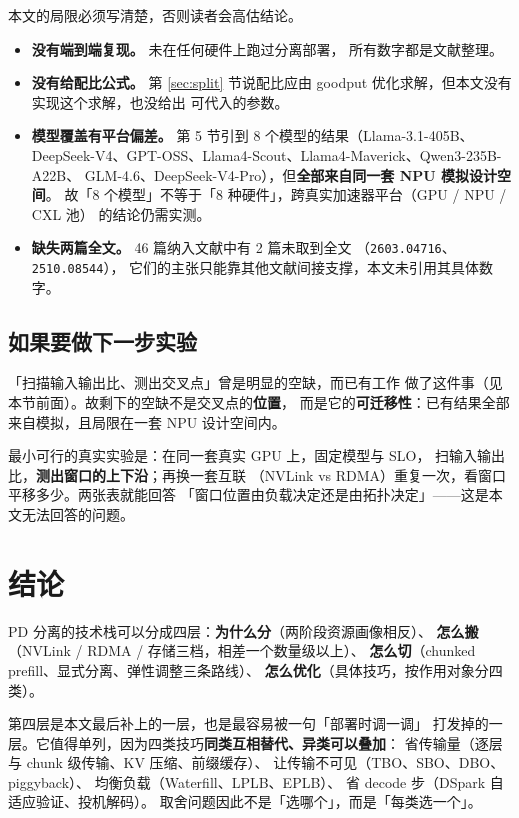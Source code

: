 本文的局限必须写清楚，否则读者会高估结论。

\begin{itemize}[leftmargin=1.3em,itemsep=1.5pt,topsep=2pt]
  \item \textbf{没有端到端复现。} 未在任何硬件上跑过分离部署，
        所有数字都是文献整理。
  \item \textbf{没有给配比公式。} 第 \ref{sec:split} 节说配比应由
        goodput 优化求解，但本文没有实现这个求解，也没给出
        可代入的参数。
  \item \textbf{模型覆盖有平台偏差。} 第 5 节引到 8 个模型的结果（Llama-3.1-405B、
        DeepSeek-V4、GPT-OSS、Llama4-Scout、Llama4-Maverick、Qwen3-235B-A22B、
        GLM-4.6、DeepSeek-V4-Pro），但\textbf{全部来自同一套 NPU 模拟设计空间}。
        故「8 个模型」不等于「8 种硬件」，跨真实加速器平台（GPU / NPU / CXL 池）
        的结论仍需实测。
  \item \textbf{缺失两篇全文。} 46 篇纳入文献中有 2 篇未取到全文
        （\texttt{2603.04716}、\texttt{2510.08544}），
        它们的主张只能靠其他文献间接支撑，本文未引用其具体数字。
\end{itemize}

\subsection{如果要做下一步实验}

「扫描输入输出比、测出交叉点」曾是明显的空缺，而已有工作
做了这件事（见本节前面）。故剩下的空缺不是交叉点的\textbf{位置}，
而是它的\textbf{可迁移性}：已有结果全部来自模拟，且局限在一套
NPU 设计空间内。

最小可行的真实实验是：在同一套真实 GPU 上，固定模型与 SLO，
扫输入输出比，\textbf{测出窗口的上下沿}；再换一套互联
（NVLink vs RDMA）重复一次，看窗口平移多少。两张表就能回答
「窗口位置由负载决定还是由拓扑决定」——这是本文无法回答的问题。


\section{结论}

PD 分离的技术栈可以分成四层：\textbf{为什么分}（两阶段资源画像相反）、
\textbf{怎么搬}（NVLink / RDMA / 存储三档，相差一个数量级以上）、
\textbf{怎么切}（chunked prefill、显式分离、弹性调整三条路线）、
\textbf{怎么优化}（具体技巧，按作用对象分四类）。

第四层是本文最后补上的一层，也是最容易被一句「部署时调一调」
打发掉的一层。它值得单列，因为四类技巧\textbf{同类互相替代、异类可以叠加}：
省传输量（逐层与 chunk 级传输、KV 压缩、前缀缓存）、
让传输不可见（TBO、SBO、DBO、piggyback）、
均衡负载（Waterfill、LPLB、EPLB）、
省 decode 步（DSpark 自适应验证、投机解码）。
取舍问题因此不是「选哪个」，而是「每类选一个」。

